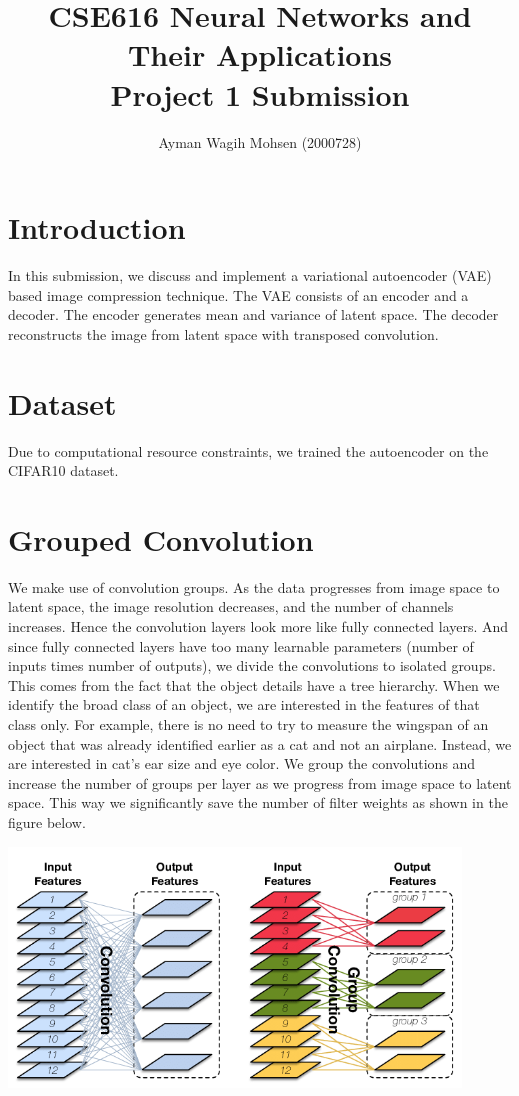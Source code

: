 \documentclass[10pt]{article}
\begin{document}
\title{CSE616 Neural Networks and Their Applications\\
Project 1 Submission}
\author{Ayman Wagih Mohsen (2000728)}
\maketitle

\section{Introduction}
In this submission, we discuss and implement a variational autoencoder (VAE) based image compression technique. The VAE consists of an encoder and a decoder. The encoder generates mean and variance of latent space. The decoder reconstructs the image from latent space with transposed convolution.

\section{Dataset}
Due to computational resource constraints, we trained the autoencoder on the CIFAR10 dataset.

\section{Grouped Convolution}
We make use of convolution groups. As the data progresses from image space to latent space, the image resolution decreases, and the number of channels increases. Hence the convolution layers look more like fully connected layers. And since fully connected layers have too many learnable parameters (number of inputs times number of outputs), we divide the convolutions to isolated groups. This comes from the fact that the object details have a tree hierarchy. When we identify the broad class of an object, we are interested in the features of that class only. For example, there is no need to try to measure the wingspan of an object that was already identified earlier as a cat and not an airplane. Instead, we are interested in cat's ear size and eye color. We group the convolutions and increase the number of groups per layer as we progress from image space to latent space. This way we significantly save the number of filter weights as shown in the figure below.

\begin{center}
\includegraphics[width=0.9\textwidth]{grouped convolution.png}
\end{center}
\end{document}
